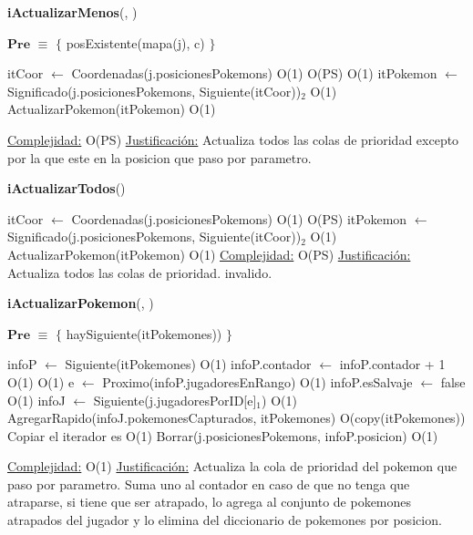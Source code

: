 \begin{algorithm}[H]{\textbf{iActualizarMenos}(, )} 

$\textbf{Pre}$ $\equiv$ $\{$ posExistente(mapa(j), c) $\}$
	\begin{algorithmic}
		\State itCoor $\gets$ Coordenadas(j.posicionesPokemons)	\Comment O(1)
			\Comment O(PS)
				\Comment O(1)
				\State itPokemon $\gets$ Significado(j.posicionesPokemons, Siguiente(itCoor))$_{2}$	\Comment O(1)
					\State ActualizarPokemon(itPokemon)	\Comment O(1)
			\EndIf
		\EndWhile

	
		\medskip
		\Statex \underline{Complejidad:} O(PS)
		\Statex \underline{Justificación:} Actualiza todos las colas de prioridad excepto por la que este en la posicion que paso por parametro.
    \end{algorithmic}
\end{algorithm}

\begin{algorithm}[H]{\textbf{iActualizarTodos}()} 
	\begin{algorithmic}
		\State itCoor $\gets$ Coordenadas(j.posicionesPokemons)	\Comment O(1)
			\Comment O(PS)
			\State itPokemon $\gets$ Significado(j.posicionesPokemons, Siguiente(itCoor))$_{2}$	\Comment O(1)
				\State ActualizarPokemon(itPokemon)	\Comment O(1)
		\EndWhile
		\medskip
		\Statex \underline{Complejidad:} O(PS)
		\Statex \underline{Justificación:} Actualiza todos las colas de prioridad. invalido.
    \end{algorithmic}
\end{algorithm}

\begin{algorithm}[H]{\textbf{iActualizarPokemon}(, )} 

$\textbf{Pre}$ $\equiv$ $\{$ haySiguiente(itPokemones)) $\}$
	\begin{algorithmic}
		\State infoP $\gets$ Siguiente(itPokemones)	\Comment O(1)
		\State infoP.contador $\gets$ infoP.contador + 1	\Comment O(1)
    	\Comment O(1)
			\State e $\gets$ Proximo(infoP.jugadoresEnRango)	\Comment O(1)
			\State infoP.esSalvaje $\gets$ false	\Comment O(1)
			\State infoJ $\gets$ Siguiente(j.jugadoresPorID[e]$_{1}$)	\Comment O(1)
			\State AgregarRapido(infoJ.pokemonesCapturados, itPokemones)	\Comment O(copy(itPokemones)) {Copiar el iterador es O(1)}
			\State Borrar(j.posicionesPokemons, infoP.posicion) \Comment O(1)
		\EndIf

    \medskip
		\Statex \underline{Complejidad:} O(1)
		\Statex \underline{Justificación:} Actualiza la cola de prioridad del pokemon que paso por parametro. Suma uno al contador en caso de que no tenga que atraparse, si tiene que ser atrapado, lo agrega al conjunto de pokemones atrapados del jugador y lo elimina del diccionario de pokemones por posicion.
    \end{algorithmic}
\end{algorithm}

